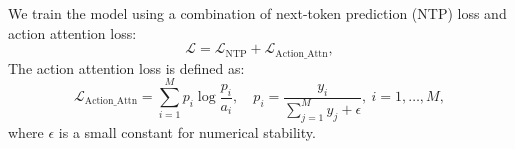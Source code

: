 \documentclass{article}
\begin{document}


We train the model using a combination of next-token prediction (NTP) loss and action attention loss: 
\begin{equation}
\mathcal{L} = \mathcal{L}_{\text{NTP}} + \mathcal{L}_{\text{Action\_Attn}},
\end{equation}
The action attention loss is defined as:
\begin{equation}
\mathcal{L}_{\text{Action\_Attn}} = \sum_{i=1}^M p_i \log \frac{p_i}{a_i}, \quad p_i = \frac{y_i}{\sum_{j=1}^M y_j + \epsilon}, ~i = 1, \dots, M,
\end{equation}
where $\epsilon$ is a small constant for numerical stability.
\end{document}
